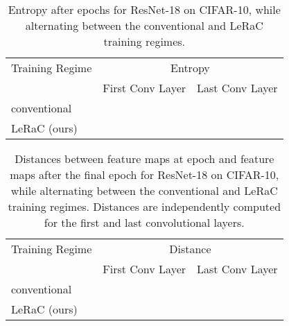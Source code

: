\documentclass[10pt,twocolumn,letterpaper]{article}
\begin{document}
\begin{table}[t]
  \small{
\begin{center}
  \begin{tabular}{lcc}
    \toprule
    Training Regime     & \multicolumn{2}{c}{Entropy} \\
    & First Conv Layer & Last Conv Layer \\
    \midrule
     conventional             &  & \\
      LeRaC (ours)              &  &  \\
    \bottomrule
  \end{tabular}
    \end{center}
    }
      \vspace{-0.6cm}
    \caption{Entropy after  epochs for ResNet-18 on CIFAR-10, while alternating between the conventional and LeRaC training regimes.}
  \label{tab_entropy}
\end{table}

\begin{table}[t]
  \small{
\begin{center}
  \begin{tabular}{lcc}
    \toprule
    Training Regime     & \multicolumn{2}{c}{Distance} \\
    & First Conv Layer & Last Conv Layer \\
    \midrule
     conventional             &  & \\
      LeRaC (ours)              &  &  \\
    \bottomrule
  \end{tabular}
    \end{center}
    }
      \vspace{-0.6cm}
    \caption{Distances between feature maps at epoch  and feature maps after the final epoch for ResNet-18 on CIFAR-10, while alternating between the conventional and LeRaC training regimes. Distances are independently computed for the first and last convolutional layers.}
  \label{tab_distance}
\end{table}
\end{document}
